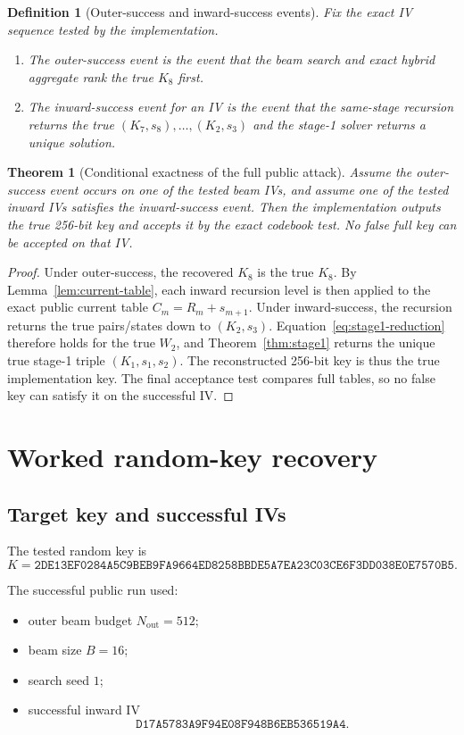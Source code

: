 \documentclass[11pt]{article}
\newtheorem{theorem}{Theorem}
\newtheorem{definition}{Definition}
\begin{document}
\begin{definition}[Outer-success and inward-success events]
Fix the exact IV sequence tested by the implementation.
\begin{enumerate}[label=(\alph*),leftmargin=1.5em]
\item The \emph{outer-success event} is the event that the beam search and exact hybrid aggregate rank the true $K_8$ first.
\item The \emph{inward-success event} for an IV is the event that the same-stage recursion returns the true $(K_7,s_8),\dots,(K_2,s_3)$ and the stage-1 solver returns a unique solution.
\end{enumerate}
\end{definition}

\begin{theorem}[Conditional exactness of the full public attack]
\label{thm:main}
Assume the outer-success event occurs on one of the tested beam IVs, and assume one of the tested inward IVs satisfies the inward-success event. Then the implementation outputs the true 256-bit key and accepts it by the exact codebook test. No false full key can be accepted on that IV.
\end{theorem}

\begin{proof}
Under outer-success, the recovered $K_8$ is the true $K_8$. By Lemma~\ref{lem:current-table}, each inward recursion level is then applied to the exact public current table $C_m=R_m+s_{m+1}$. Under inward-success, the recursion returns the true pairs/states down to $(K_2,s_3)$. Equation~\eqref{eq:stage1-reduction} therefore holds for the true $W_2$, and Theorem~\ref{thm:stage1} returns the unique true stage-1 triple $(K_1,s_1,s_2)$. The reconstructed 256-bit key is thus the true implementation key. The final acceptance test compares full tables, so no false key can satisfy it on the successful IV.
\end{proof}

\section{Worked random-key recovery}
\subsection{Target key and successful IVs}
The tested random key is
\[
K=
\texttt{2DE13EF0284A5C9BEB9FA9664ED8258BBDE5A7EA23C03CE6F3DD038E0E7570B5}.
\]

The successful public run used:
\begin{itemize}[leftmargin=1.5em]
\item outer beam budget $N_{\mathrm{out}}=512$;
\item beam size $B=16$;
\item search seed $1$;
\item successful inward IV
\[
\texttt{D17A5783A9F94E08F948B6EB536519A4}.
\]
\end{itemize}
\end{document}
